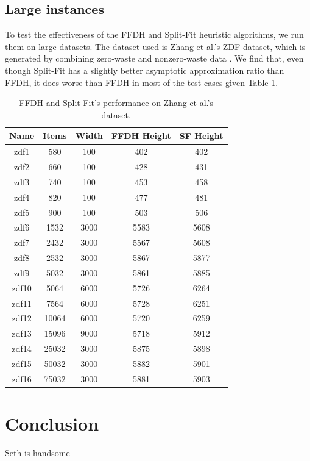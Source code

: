 \documentclass{article}
\begin{document}
\subsection{Large instances}
To test the effectiveness of the FFDH and Split-Fit heuristic algorithms, we run them on large datasets. The dataset used is Zhang et al.'s ZDF dataset, which is generated by combining zero-waste and nonzero-waste data \cite{zdf}. We find that, even though Split-Fit has a slightly better asymptotic approximation ratio than FFDH, it does worse than FFDH in most of the test cases given Table \ref{table:zdftest}.

\begin{table}
\centering
\begin{tabular}{|c|c|c|c|c|}
\hline Name & Items & Width & FFDH Height & SF Height \\
\hline zdf1 & 580 & 100 & 402 & 402 \\
\hline zdf2 & 660 & 100 & 428 & 431 \\
\hline zdf3 & 740 & 100 & 453 & 458 \\
\hline zdf4 & 820 & 100 & 477 & 481 \\
\hline zdf5 & 900 & 100 & 503 & 506 \\
\hline zdf6 & 1532 & 3000 & 5583 & 5608 \\
\hline zdf7 & 2432 & 3000 & 5567 & 5608 \\
\hline zdf8 & 2532 & 3000 & 5867 & 5877 \\
\hline zdf9 & 5032 & 3000 & 5861 & 5885 \\
\hline zdf10 & 5064 & 6000 & 5726 & 6264 \\
\hline zdf11 & 7564 & 6000 & 5728 & 6251 \\
\hline zdf12 & 10064 & 6000 & 5720 & 6259 \\
\hline zdf13 & 15096 & 9000 & 5718 & 5912 \\
\hline zdf14 & 25032 & 3000 & 5875 & 5898 \\
\hline zdf15 & 50032 & 3000 & 5882 & 5901 \\
\hline zdf16 & 75032 & 3000 & 5881 & 5903 \\
\hline
\end{tabular}
\caption{FFDH and Split-Fit's performance on Zhang et al.'s dataset.}
\label{table:zdftest}
\end{table}

\section{Conclusion}
Seth is handsome
\end{document}
